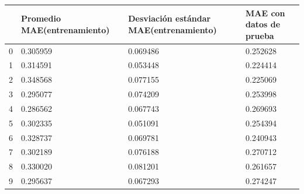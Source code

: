 \begin{tabular}{llll}
\toprule
 & Promedio MAE(entrenamiento) & Desviación estándar MAE(entrenamiento) & MAE con datos de prueba \\
\midrule
0 & 0.305959 & 0.069486 & 0.252628 \\
1 & 0.314591 & 0.053448 & 0.224414 \\
2 & 0.348568 & 0.077155 & 0.225069 \\
3 & 0.295077 & 0.074209 & 0.253998 \\
4 & 0.286562 & 0.067743 & 0.269693 \\
5 & 0.302335 & 0.051091 & 0.254394 \\
6 & 0.328737 & 0.069781 & 0.240943 \\
7 & 0.302189 & 0.076188 & 0.270712 \\
8 & 0.330020 & 0.081201 & 0.261657 \\
9 & 0.295637 & 0.067293 & 0.274247 \\
\bottomrule
\end{tabular}
